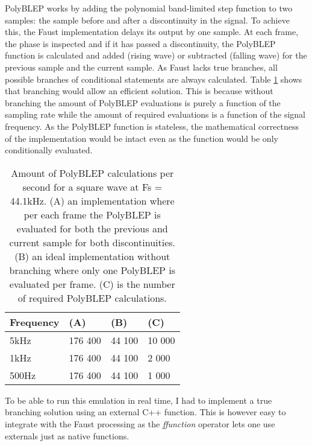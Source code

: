 \documentclass[11pt,a4paper]{article}
\begin{document}
PolyBLEP works by adding the polynomial band-limited step function to two samples: the sample before and after a discontinuity in the signal. To achieve this, the Faust implementation delays its output by one sample. At each frame, the phase is inspected and if it has passed a discontinuity, the PolyBLEP function is calculated and added (rising wave) or subtracted (falling wave) for the previous sample and the current sample. As Faust lacks true branches, all possible branches of conditional statements are always calculated. Table \ref{table:polyblep-amount} shows that branching would allow an efficient solution. This is because without branching the amount of PolyBLEP evaluations is purely a function of the sampling rate while the amount of required evaluations is a function of the signal frequency. As the PolyBLEP function is stateless, the mathematical correctness of the implementation would be intact even as the function would be only conditionally evaluated.

\begin{table}[h]
 \begin{center}
\begin{tabular}{|l|l|l|l|}

      \hline
      Frequency & (A)        &  (B)         & (C) \\
      \hline\hline
      5kHz     & 176 400     & 44 100       & 10 000\\
      1kHz     & 176 400     & 44 100       &  2 000\\
      500Hz    & 176 400     & 44 100       &  1 000\\
      \hline

\end{tabular}
\caption{Amount of PolyBLEP calculations per second for a square wave at Fs = 44.1kHz. 
(A) an implementation where per each frame the PolyBLEP is evaluated for both the previous and current sample for both discontinuities.
(B) an ideal implementation without branching where only one PolyBLEP is evaluated per frame.
(C) is the number of required PolyBLEP calculations.  }\label{table:polyblep-amount}
 \end{center}
\end{table}

To be able to run this emulation in real time, I had to implement a true branching solution using an external C++ function. This is however easy to integrate with the Faust processing as the \emph{ffunction} operator lets one use externals just as native functions.
\end{document}
